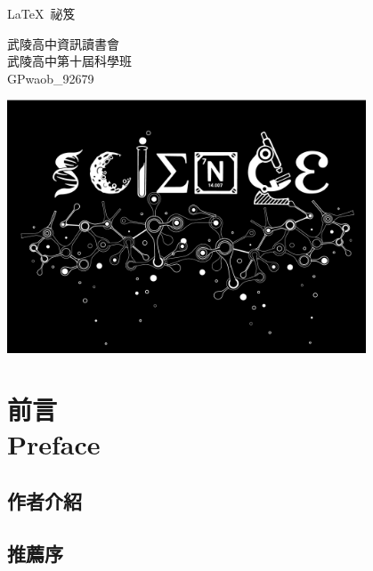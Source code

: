 \documentclass[12pt, a4paper, oneside]{extbook}
\let\tmpLaTeX\LaTeX
\renewcommand{\LaTeX}{\textrm{\tmpLaTeX}}
\begin{document}
	\makebarother %

	\begin{titlepage}
		\begin{center}
			\sffamily
			
			\begin{tcolorbox}[
				halign=flush center,
				drop fuzzy shadow,
				arc=2pt,
				height=4cm,
				valign=center]
				\fontsize{36pt}{\baselineskip}\selectfont \LaTeX\ 祕笈
			\end{tcolorbox}
			
			\vspace*{1cm}
			{\fontsize{24pt}{2\baselineskip}\selectfont%
				武陵高中資訊讀書會 \\
				武陵高中第十屆科學班 \\[\baselineskip]
				GPwaob\_92679}
			 
			
			\vfill
			
			\includegraphics[width=0.8\textwidth]{readme/science.png}
		
		
		\end{center}
	\end{titlepage}

	\tableofcontents

	\part{前言\\ Preface}
	\chapter*{作者介紹}
	\chapter*{推薦序}
	
\end{document}
